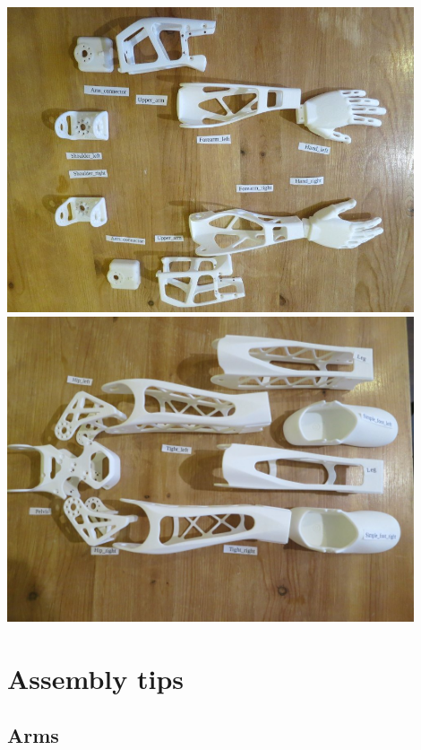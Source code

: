 \documentclass[includefoot]{article}
\begin{document}
\begin{center}
  \vspace{1mm}
  \includegraphics[width=0.9\textwidth]{img/parts_arms}\\
  \vspace{1mm}
  \includegraphics[width=0.9\textwidth]{img/parts_legs}
 \end{center}


\section{Assembly tips}
 \label{assembly-tips}




\subsection{Arms} 
 
\end{document}
